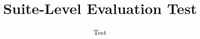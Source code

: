 \documentclass[conference,10pt]{IEEEtran}
\begin{document}
\title{Suite-Level Evaluation Test}
\author{Test}
\maketitle


\end{document}
